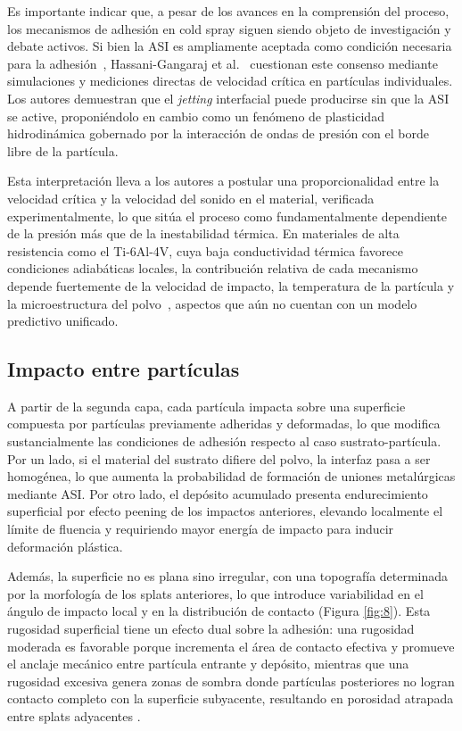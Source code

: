Es importante indicar que, a pesar de los avances en la comprensión 
del proceso, los mecanismos de adhesión en cold spray siguen siendo 
objeto de investigación y debate activos. Si bien la ASI es 
ampliamente aceptada como condición necesaria para la 
adhesión~\cite{Assadi2003, Moridi2014}, Hassani-Gangaraj et 
al.~\cite{HassaniGangaraj2018} cuestionan este consenso mediante 
simulaciones y mediciones directas de velocidad crítica en partículas 
individuales. Los autores demuestran que el \textit{jetting} interfacial 
puede producirse sin que la ASI se active, proponiéndolo en cambio como 
un fenómeno de plasticidad hidrodinámica gobernado por la interacción 
de ondas de presión con el borde libre de la partícula. 

Esta interpretación lleva a los autores a postular una 
proporcionalidad entre la velocidad crítica y la velocidad del sonido 
en el material, verificada experimentalmente, lo que sitúa el proceso 
como fundamentalmente dependiente de la presión más que de la 
inestabilidad térmica. En materiales de alta resistencia como el 
Ti-6Al-4V, cuya baja conductividad térmica favorece condiciones 
adiabáticas locales, la contribución relativa de cada mecanismo depende 
fuertemente de la velocidad de impacto, la temperatura de la partícula 
y la microestructura del polvo~\cite{Huang2020}, aspectos que aún no 
cuentan con un modelo predictivo unificado.

\subsection{Impacto entre partículas}

A partir de la segunda capa, cada partícula impacta sobre una superficie 
compuesta por partículas previamente adheridas y deformadas, lo que modifica 
sustancialmente las condiciones de adhesión respecto al caso sustrato-partícula. 
Por un lado, si el material del sustrato difiere del polvo, la interfaz pasa 
a ser homogénea, lo que aumenta la probabilidad de formación de uniones 
metalúrgicas mediante ASI. Por otro lado, el depósito acumulado presenta 
endurecimiento superficial por efecto peening de los impactos anteriores, 
elevando localmente el límite de fluencia y requiriendo mayor energía de 
impacto para inducir deformación plástica. 

Además, la superficie no es plana sino irregular, con una topografía determinada por la morfología de los splats anteriores, lo que introduce variabilidad en el ángulo de impacto local y en la distribución de contacto (Figura \ref{fig:8}). Esta rugosidad superficial tiene un efecto dual sobre la adhesión: una rugosidad moderada es favorable porque incrementa el área de contacto efectiva y promueve el anclaje mecánico entre partícula entrante y depósito, mientras que una rugosidad excesiva genera zonas de sombra donde partículas posteriores no logran contacto completo con la superficie subyacente, resultando en porosidad atrapada entre splats adyacentes \cite{Moridi2014}.

